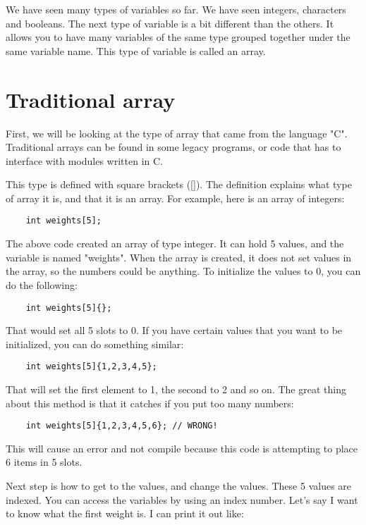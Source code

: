 We have seen many types of variables so far. We have seen integers, characters and booleans. The next type of variable
is a bit different than the others. It allows you to have
many variables of the same type grouped together under the
same variable name. This type of variable is called an array.
\section{Traditional array}
First, we will be looking at the type of array that came from
the language "C". Traditional arrays can be found in some legacy programs, or code that has to interface with modules written in C.

This type is defined with square brackets ([]). The definition explains what type of array it is, and that it
is an array. For example, here is an array of integers:

\begin{verbatim}
    int weights[5];
\end{verbatim}
The above code created an array of type integer. It can hold
5 values, and the variable is named "weights". When the array is created, it does not set values in the array, so the numbers could be anything. To initialize the values to 0, 
you can do the following:
\begin{verbatim}
    int weights[5]{};
\end{verbatim}
That would set all 5 slots to 0. If you have certain values that you want to be initialized,
you can do something similar:
\begin{verbatim}
    int weights[5]{1,2,3,4,5};
\end{verbatim}
That will set the first element to 1, the second to 2 and so on. The great thing about this method is that it catches if you
put too many numbers:
\begin{verbatim}
    int weights[5]{1,2,3,4,5,6}; // WRONG!
\end{verbatim}
This will cause an error and not compile because this code
is attempting to place 6 items in 5 slots.

Next step is how to get to the values, and change the values.
These 5 values are indexed. You can access the variables by
using an index number. Let's say I want to know what the first weight is. I can print it out like:

